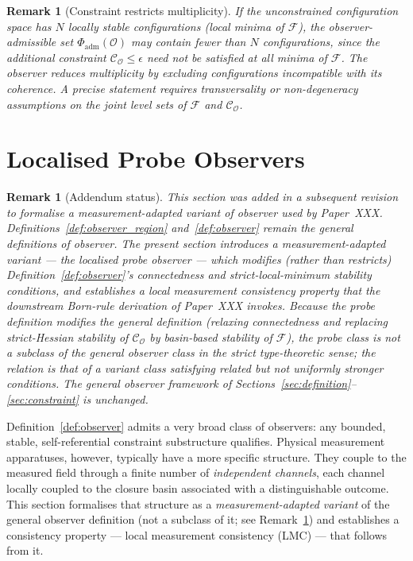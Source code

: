 \documentclass[12pt]{article}
\newtheorem{remark}[theorem]{Remark}
\newcommand{\Fcal}{\mathcal{F}}
\newcommand{\Ocal}{\mathcal{O}}
\newcommand{\Ccal}{\mathcal{C}}
\begin{document}
\begin{remark}[Constraint restricts multiplicity]\label{rem:restriction}
If the unconstrained configuration space has $N$ locally stable configurations (local minima of $\Fcal$), the observer-admissible set $\Phi_{\mathrm{adm}}(\Ocal)$ may contain fewer than $N$ configurations, since the additional constraint $\Ccal_\Ocal \leq \epsilon$ need not be satisfied at all minima of $\Fcal$. The observer reduces multiplicity by excluding configurations incompatible with its coherence. A precise statement requires transversality or non-degeneracy assumptions on the joint level sets of $\Fcal$ and $\Ccal_\Ocal$.
\end{remark}

\section{Localised Probe Observers}\label{sec:localised}

\begin{remark}[Addendum status]\label{rem:addendum_localised}
This section was added in a subsequent revision to formalise a measurement-adapted variant of observer used by Paper~XXX. Definitions~\ref{def:observer_region} and~\ref{def:observer} remain the general definitions of observer. The present section introduces a \emph{measurement-adapted variant} --- the \emph{localised probe observer} --- which \emph{modifies} (rather than restricts) Definition~\ref{def:observer}'s connectedness and strict-local-minimum stability conditions, and establishes a local measurement consistency property that the downstream Born-rule derivation of Paper~XXX invokes. Because the probe definition modifies the general definition (relaxing connectedness and replacing strict-Hessian stability of $\Ccal_\Ocal$ by basin-based stability of $\Fcal$), the probe class is \emph{not} a subclass of the general observer class in the strict type-theoretic sense; the relation is that of a variant class satisfying related but not uniformly stronger conditions. The general observer framework of Sections~\ref{sec:definition}--\ref{sec:constraint} is unchanged.
\end{remark}

Definition~\ref{def:observer} admits a very broad class of observers: any bounded, stable, self-referential constraint substructure qualifies. Physical measurement apparatuses, however, typically have a more specific structure. They couple to the measured field through a finite number of \emph{independent channels}, each channel locally coupled to the closure basin associated with a distinguishable outcome. This section formalises that structure as a \emph{measurement-adapted variant} of the general observer definition (not a subclass of it; see Remark~\ref{rem:addendum_localised}) and establishes a consistency property --- local measurement consistency (LMC) --- that follows from it.
\end{document}
